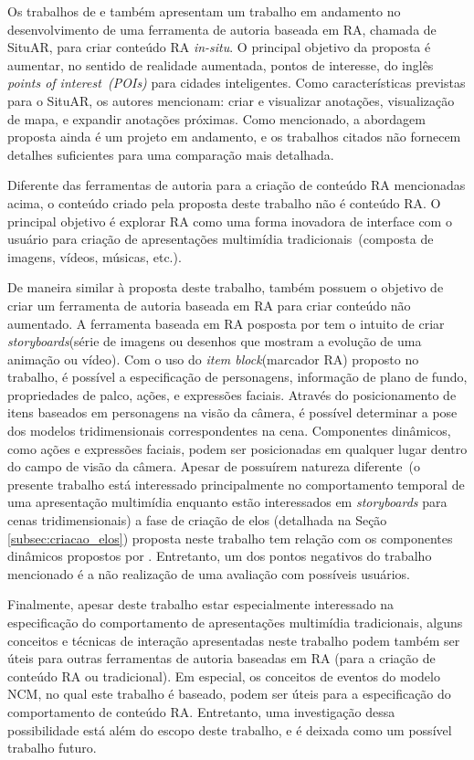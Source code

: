 \documentclass[../main.tex]{subfiles}
\begin{document}
Os trabalhos de  e  também apresentam um trabalho em andamento no desenvolvimento de uma ferramenta de autoria baseada em RA, chamada de SituAR, para criar conteúdo RA \emph{in-situ}. O principal objetivo da proposta é aumentar, no sentido de realidade aumentada, pontos de interesse, do inglês \emph{points of interest~(POIs)} para cidades inteligentes. Como características previstas para o SituAR, os autores mencionam: criar e visualizar anotações, visualização de mapa, e expandir anotações próximas. Como mencionado, a abordagem proposta ainda é um projeto em andamento, e os trabalhos citados não fornecem detalhes suficientes para uma comparação mais detalhada.

Diferente das ferramentas de autoria para a criação de conteúdo RA mencionadas acima, o conteúdo criado pela proposta deste trabalho não é conteúdo RA. O principal objetivo é explorar RA como uma forma inovadora de interface com o usuário para criação de apresentações multimídia tradicionais~(composta de imagens, vídeos, músicas, etc.).

De maneira similar à proposta deste trabalho,  também possuem o objetivo de criar um ferramenta de autoria baseada em RA para criar conteúdo não aumentado. A ferramenta baseada em RA posposta por  tem o intuito de criar \emph{storyboards}(série de imagens ou desenhos que mostram a evolução de uma animação ou vídeo). Com o uso do \emph{item block}(marcador RA) proposto no trabalho, é possível a especificação de personagens, informação de plano de fundo, propriedades de palco, ações, e expressões faciais. Através do posicionamento de itens baseados em personagens na visão da câmera, é possível determinar a pose dos modelos tridimensionais correspondentes na cena. Componentes dinâmicos, como ações e expressões faciais, podem ser posicionadas em qualquer lugar dentro do campo de visão da câmera. Apesar de possuírem natureza diferente~(o presente trabalho está interessado principalmente no comportamento temporal de uma apresentação multimídia enquanto  estão interessados em \emph{storyboards} para cenas tridimensionais) a fase de criação de elos (detalhada na Seção \ref{subsec:criacao_elos}) proposta neste trabalho tem relação com os componentes dinâmicos propostos por . Entretanto, um dos pontos negativos do trabalho mencionado é a não realização de uma avaliação com possíveis usuários.

Finalmente, apesar deste trabalho estar especialmente interessado na especificação do comportamento de apresentações multimídia tradicionais, alguns conceitos e técnicas de interação apresentadas neste trabalho podem também ser úteis para outras ferramentas de autoria baseadas em RA (para a criação de conteúdo RA ou tradicional). Em especial, os conceitos de eventos do modelo NCM, no qual este trabalho é baseado, podem ser úteis para a especificação do comportamento de conteúdo RA. Entretanto, uma investigação dessa possibilidade está além do escopo deste trabalho, e é deixada como um possível trabalho futuro. 
\end{document}
